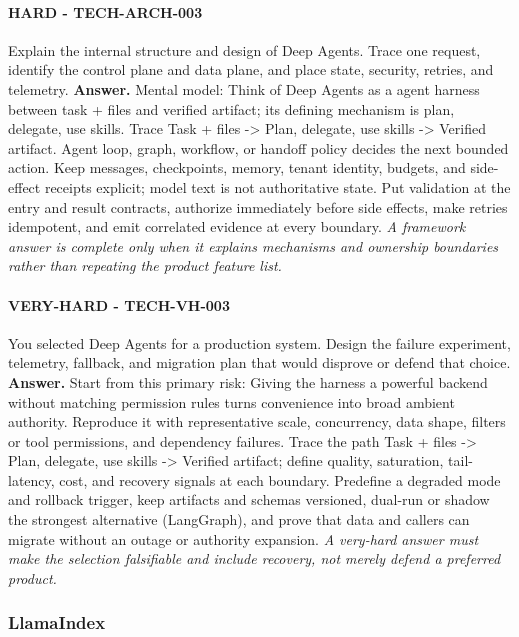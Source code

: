 \paragraph{HARD - TECH-ARCH-003} Explain the internal structure and design of Deep Agents. Trace one request, identify the control plane and data plane, and place state, security, retries, and telemetry.
\textbf{Answer.} Mental model: Think of Deep Agents as a agent harness between task + files and verified artifact; its defining mechanism is plan, delegate, use skills. Trace Task + files -> Plan, delegate, use skills -> Verified artifact. Agent loop, graph, workflow, or handoff policy decides the next bounded action. Keep messages, checkpoints, memory, tenant identity, budgets, and side-effect receipts explicit; model text is not authoritative state. Put validation at the entry and result contracts, authorize immediately before side effects, make retries idempotent, and emit correlated evidence at every boundary.
\textit{A framework answer is complete only when it explains mechanisms and ownership boundaries rather than repeating the product feature list.}
\paragraph{VERY-HARD - TECH-VH-003} You selected Deep Agents for a production system. Design the failure experiment, telemetry, fallback, and migration plan that would disprove or defend that choice.
\textbf{Answer.} Start from this primary risk: Giving the harness a powerful backend without matching permission rules turns convenience into broad ambient authority. Reproduce it with representative scale, concurrency, data shape, filters or tool permissions, and dependency failures. Trace the path Task + files -> Plan, delegate, use skills -> Verified artifact; define quality, saturation, tail-latency, cost, and recovery signals at each boundary. Predefine a degraded mode and rollback trigger, keep artifacts and schemas versioned, dual-run or shadow the strongest alternative (LangGraph), and prove that data and callers can migrate without an outage or authority expansion.
\textit{A very-hard answer must make the selection falsifiable and include recovery, not merely defend a preferred product.}
\subsubsection*{LlamaIndex}
